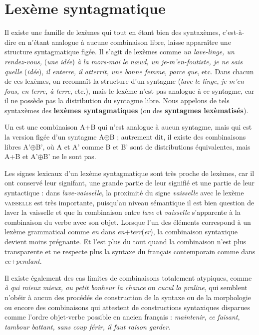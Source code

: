 \section{Lexème syntagmatique}\label{sec:3.1.12}

Il existe une famille de lexèmes qui tout en étant bien des syntaxèmes, c’est-à-dire en n’étant analogue à aucune combinaison libre, laisse apparaître une structure syntagmatique figée. Il s’agit de lexèmes comme \textit{un lave-linge, un rendez-vous,} (\textit{une idée}) \textit{à la mors-moi le nœud, un je-m’en-foutiste, je ne sais quelle} (\textit{idée}), \textit{il enterre, il atterrit, une bonne femme, parce que}, etc. Dans chacun de ces lexèmes, on reconnaît la structure d’un syntagme (\textit{lave le linge}, \textit{je m’en fous, en terre, à terre}, etc.), mais le lexème n’est pas analogue à ce syntagme, car il ne possède pas la distribution du syntagme libre. Nous appelons de tels syntaxèmes des \textbf{lexèmes syntagmatiques} (ou des \textbf{syntagmes lexèmatisés}).

\begin{styleLivreImportant}
Un  est une combinaison A+B qui n’est analogue à aucun syntagme, mais qui est la version figée d’un syntagme A${\oplus}$B ; autrement dit, il existe des combinaisons libres A’${\oplus}$B’, où A et A’ comme B et B’ sont de distribu\-tions équivalentes, mais A+B et A’${\oplus}$B’ ne le sont pas.
\end{styleLivreImportant}

Les signes lexicaux d’un lexème syntagmatique sont très proche de lexèmes, car il ont conservé leur signifant, une grande partie de leur signifié et une partie de leur syntactique : dans \textit{lave-vaisselle}, la proximité du signe \textit{vaisselle} avec le lexème \textsc{vaisselle} est très importante, puisqu’au niveau sémantique il est bien question de laver la vaisselle et que la combinaison entre \textit{lave} et \textit{vaisselle} s’apparente à la combinaison du verbe avec son objet. Lorsque l’un des éléments correspond à un lexème grammatical comme \textit{en} dans \textit{en}+\textit{terr}(\textit{er}), la combinaison syntaxique devient moins prégnante. Et l’est plus du tout quand la combinaison n’est plus transparente et ne respecte plus la syntaxe du français contemporain comme dans \textit{ce}+\textit{pendant}.

Il existe également des cas limites de combinaisons totalement atypiques, comme \textit{à qui mieux mieux, au petit bonheur la chance} ou \textit{cucul la praline}, qui semblent n’obéir à aucun des procédés de construction de la syntaxe ou de la morphologie ou encore des combinaisons qui attestent de constructions syntaxiques disparues comme l’ordre objet-verbe possible en ancien français : \textit{maintenir}, \textit{ce faisant}, \textit{tambour battant, sans coup férir, il faut raison garder}.

